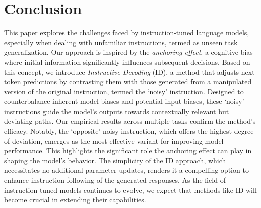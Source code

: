 \vspace{-5pt}
\section{Conclusion}
\vspace{-5pt}
This paper explores the challenges faced by instruction-tuned language models, especially when dealing with unfamiliar instructions, termed as unseen task generalization. Our approach is inspired by the \textit{anchoring effect}, a cognitive bias where initial information significantly influences subsequent decisions. Based on this concept, we introduce \textit{Instructive Decoding} (ID), a method that adjusts next-token predictions by contrasting them with those generated from a manipulated version of the original instruction, termed the `noisy' instruction. Designed to counterbalance inherent model biases and potential input biases, these `noisy' instructions guide the model's outputs towards contextually relevant but deviating paths. Our empirical results across multiple tasks confirm the method's efficacy. Notably, the `opposite' noisy instruction, which offers the highest degree of deviation, emerges as the most effective variant for improving model performance. This highlights the significant role the anchoring effect can play in shaping the model's behavior. The simplicity of the ID approach, which necessitates no additional parameter updates, renders it a compelling option to enhance instruction following of the generated responses. As the field of instruction-tuned models continues to evolve, we expect that methods like ID will become crucial in extending their capabilities.


